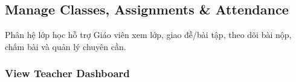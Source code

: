 \documentclass[12pt,a4paper,oneside]{report}
\begin{document}

\subsection{Manage Classes, Assignments \& Attendance}
\label{subsec:manage-classes-assignments-attendance}

Phân hệ lớp học hỗ trợ Giáo viên xem lớp, giao đề/bài tập, theo dõi bài nộp, chấm bài và quản lý chuyên cần.

\subsubsection{View Teacher Dashboard}
\label{subsubsec:view-teacher-dashboard}
\end{document}
